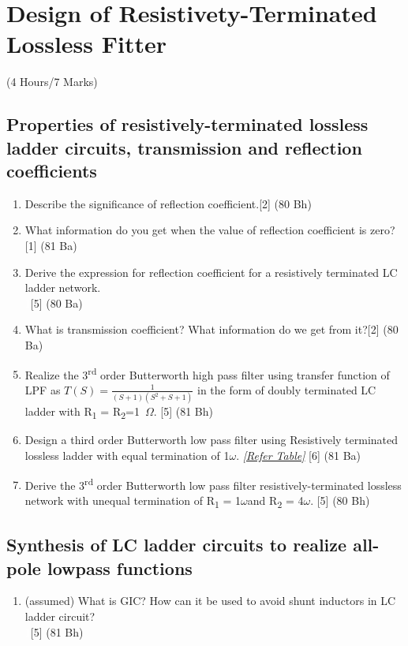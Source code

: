 \documentclass[12pt]{article}
\newcommand{\w}{\(\omega\)}
\newcommand{\enter}{\\\textcolor{white}{1}}
\begin{document}
\pagebreak
\section{Design of Resistivety-Terminated Lossless Fitter}
\begin{center}(4 Hours/7 Marks)\end{center}
\subsection{Properties of resistively-terminated lossless ladder circuits, transmission and reflection coefficients}
\begin{enumerate}
\item Describe the significance of reflection coefficient.\hfill [2] (80 Bh)
\item What information do you get when the value of reflection coefficient is zero?\hfill [1] (81 Ba)
\item Derive the expression for reflection coefficient for a resistively terminated LC ladder network.
\enter\hfill [5] (80 Ba)
\item What is transmission coefficient? What information do we get from it?\hfill[2] (80 Ba)
\item Realize the 3\textsuperscript{rd} order Butterworth high pass filter using transfer function of LPF as $T(S)= \frac{1}{(S+1)(S^2+S+1)}$ in the form of doubly terminated LC ladder with R\textsubscript{1} = R\textsubscript{2}=1~$\Omega$. \hfill [5] (81 Bh)
\item Design a third order Butterworth low pass filter using Resistively terminated lossless ladder with equal termination of 1\w. \textit{[\hyperref[sec:tables_81ba]{Refer Table]}} \hfill [6] (81 Ba)
\item Derive the 3\textsuperscript{rd} order Butterworth low pass filter resistively-terminated lossless network with unequal termination of R\textsubscript{1} = 1\w and R\textsubscript{2} = 4\w.	\hfill [5] (80 Bh)
\end{enumerate}
\subsection{Synthesis of LC ladder circuits to realize all-pole lowpass functions}
\begin{enumerate}
\item (assumed) What is GIC? How can it be used to avoid shunt inductors in LC ladder circuit?
\enter \hfill [5] (81 Bh)
\end{enumerate}
\end{document}
